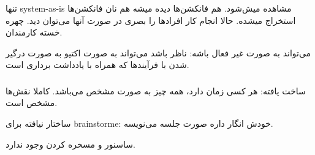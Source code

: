 تنها system-as-is مشاهده میش‌شود. هم فانکشن‌ها دیده میشه هم نان فانکشن‌ها
استخراج میشده.  حالا انجام کار افراد‌ها را بصری در صورت آنها می‌توان دید.
چهره خسته کارمندان.

می‌تواند به صورت غیر فعال باشه: ناظر باشد
می‌تواند به صورت اکتیو به صورت درگیر شدن با فرآیند‌ها که همراه با یادداشت برداری
است.


\subsubsection{}

ساخت یافته: هر کسی زمان دارد، همه چیز به صورت مشخص می‌باشد. کاملا نقش‌ها مشخص
است.

ساختار نیافته برای brainstorme: خودش انگار داره صورت جلسه می‌نویسه.

ساسنور و مسخره کردن وجود ندارد.
